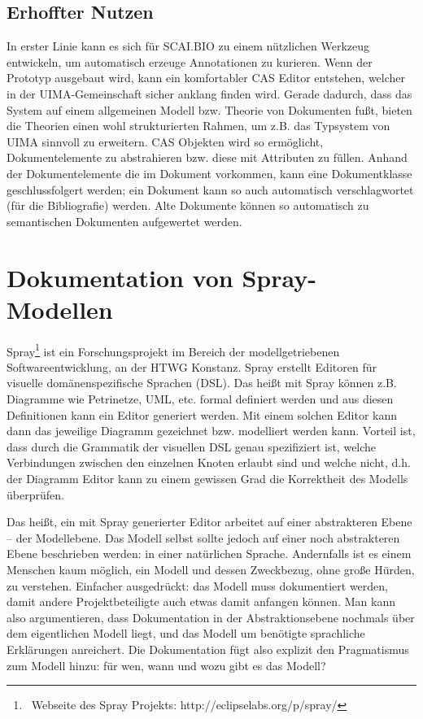  
\subsection{Erhoffter Nutzen}\label{}
 
In erster Linie kann es sich für SCAI.BIO zu einem nützlichen Werkzeug entwickeln, um automatisch erzeuge Annotationen zu kurieren. Wenn der Prototyp ausgebaut wird, kann ein komfortabler CAS Editor entstehen, welcher in der UIMA-Gemeinschaft sicher anklang finden wird. Gerade dadurch, dass das System auf einem allgemeinen Modell bzw. Theorie von Dokumenten fußt, bieten die Theorien einen wohl strukturierten Rahmen, um z.B. das Typsystem von UIMA sinnvoll zu erweitern. CAS Objekten wird so ermöglicht, Dokumentelemente zu abstrahieren bzw. diese mit Attributen zu füllen. Anhand der Dokumentelemente die im Dokument vorkommen, kann eine Dokumentklasse geschlussfolgert werden; ein Dokument kann so auch automatisch verschlagwortet (für die Bibliografie) werden. Alte Dokumente können so automatisch zu semantischen Dokumenten aufgewertet werden.

 
\section{Dokumentation von Spray-Modellen}\label{doku-spray}
 
Spray\footnote{~Webseite des Spray Projekts: http://eclipselabs.org/p/spray/} ist ein Forschungsprojekt im Bereich der modellgetriebenen Softwareentwicklung, an der HTWG Konstanz. Spray erstellt Editoren für visuelle domänenspezifische Sprachen (DSL). Das heißt mit Spray können z.B. Diagramme wie Petrinetze, UML, etc. formal definiert werden und aus diesen Definitionen kann ein Editor generiert werden. Mit einem solchen Editor kann dann das jeweilige Diagramm gezeichnet bzw. modelliert werden kann. Vorteil ist, dass durch die Grammatik der visuellen DSL genau spezifiziert ist, welche Verbindungen zwischen den einzelnen Knoten erlaubt sind und welche nicht, d.h. der Diagramm Editor kann zu einem gewissen Grad die Korrektheit des Modells überprüfen.

 
Das heißt, ein mit Spray generierter Editor arbeitet auf einer abstrakteren Ebene -- der Modellebene. Das Modell selbst sollte jedoch auf einer noch abstrakteren Ebene beschrieben werden: in einer natürlichen Sprache. Andernfalls ist es einem Menschen kaum möglich, ein Modell und dessen Zweckbezug, ohne große Hürden, zu verstehen. Einfacher ausgedrückt: das Modell muss dokumentiert werden, damit andere Projektbeteiligte auch etwas damit anfangen können. Man kann also argumentieren, dass Dokumentation in der Abstraktionsebene nochmals über dem eigentlichen Modell liegt, und das Modell um benötigte sprachliche Erklärungen anreichert. Die Dokumentation fügt also explizit den Pragmatismus zum Modell hinzu: für wen, wann und wozu gibt es das Modell?

